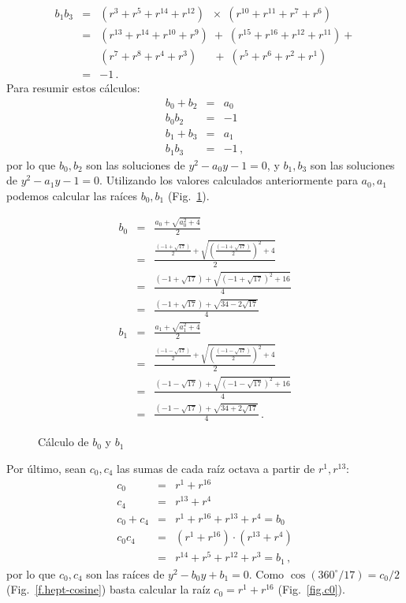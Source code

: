 \begin{eqnarray*}
b_1b_3&=&(r^3 + r^{5} + r^{14} +r^{12})\;\;\times\;(r^{10} + r^{11} + r^{7} +r^{6})\\
&=&(r^{13}+r^{14}+r^{10}+r^9)\;+\;(r^{15}+r^{16}+r^{12}+r^{11})+\\
&&(r^{7}+r^{8}+r^4+r^3)\quad\;\, +\;(r^{5}+r^{6}+r^{2}+r^1)\\
&=&-1\,.
\end{eqnarray*}
Para resumir estos cálculos:
\begin{eqnarray*}
b_0+b_2&=&a_0\\
b_0b_2&=&-1\\
b_1+b_3&=&a_1\\
b_1b_3&=&-1\,,
\end{eqnarray*}
por lo que $b_0,b_2$ son las soluciones de $y^2-a_0y-1= 0$, y $b_1,b_3$ son las soluciones de $y^2-a_1y-1 =0$. Utilizando los valores calculados anteriormente para $a_0,a_1$ podemos calcular las raíces $b_0,b_1$ (Fig.~\ref{f.b0b1}).
\begin{figure}[t]
\begin{eqnarray*}
b_0&=&\frac{a_0+\sqrt{a_0^2+4}}{2}\\
&=&\frac{
     \displaystyle\frac{(-1+\sqrt{17})}{2} + 
     \sqrt{\left(\displaystyle\frac{(-1+\sqrt{17})}{2}\right)^2+4}
   }{2}\\
&=&\frac{
     (-1+\sqrt{17}) + 
     \sqrt{\left(-1+\sqrt{17}\right)^2+16}
   }{4}\\
&=&\frac{
     (-1+\sqrt{17}) + 
     \sqrt{34-2\sqrt{17}}
   }{4}\\
b_1&=&\frac{a_1+\sqrt{a_1^2+4}}{2}\\
&=&\frac{
     \displaystyle\frac{(-1-\sqrt{17})}{2} + 
     \sqrt{\left(\displaystyle\frac{(-1-\sqrt{17})}{2}\right)^2+4}
   }{2}\\
&=&\frac{
     (-1-\sqrt{17}) + 
     \sqrt{\left(-1-\sqrt{17}\right)^2+16}
   }{4}\\
&=&\frac{
     (-1-\sqrt{17}) + 
     \sqrt{34+2\sqrt{17}}
   }{4}\,.
\end{eqnarray*}
\caption{Cálculo de $b_0$ y $b_1$}\label{f.b0b1}
\end{figure}

Por último, sean $c_0,c_4$ las sumas de cada raíz octava a partir de $r^1,r^{13}$:
\begin{eqnarray*}
c_0&=&r^1+r^{16}\\
c_4&=&r^{13}+r^4\\
c_0+c_4&=&r^1+r^{16}+r^{13}+r^4=b_0\\
c_0c_4&=&(r^1+r^{16})\cdot(r^{13}+r^4)\\
&=&r^{14}+r^5+r^{12}+r^3=b_1\,,
\end{eqnarray*}
por lo que $c_0,c_4$ son las raíces de $y^2-b_0y+b_1=0$. Como $\cos(360^\circ/17) = c_0/2$ (Fig.~\ref{f.hept-cosine}) basta calcular la raíz $c_0=r^1+r^{16}$ (Fig.~\ref{fig.c0}).

